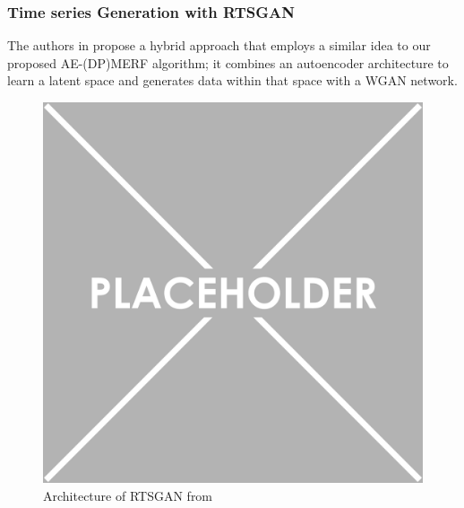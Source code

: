 \subsubsection{Time series Generation with RTSGAN}
The authors in \parencite{pei2021towards} propose a hybrid approach that employs a similar idea to our proposed AE-(DP)MERF algorithm; it combines an autoencoder architecture to learn a latent space and generates data within that space with a WGAN network.

\begin{figure}[h]
    \centering
    \includegraphics[scale=0.5]{../images/placeholder.png}
    \caption{Architecture of RTSGAN from \parencite{pei2021towards}}
    \label{fig:rtsgan_arch}
\end{figure}

